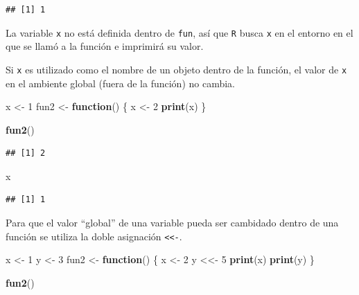 \documentclass[]{book}
\newenvironment{Shaded}{\begin{snugshade}}{\end{snugshade}}
\newcommand{\ControlFlowTok}[1]{\textcolor[rgb]{0.13,0.29,0.53}{\textbf{#1}}}
\newcommand{\DecValTok}[1]{\textcolor[rgb]{0.00,0.00,0.81}{#1}}
\newcommand{\KeywordTok}[1]{\textcolor[rgb]{0.13,0.29,0.53}{\textbf{#1}}}
\newcommand{\NormalTok}[1]{#1}
\newcommand{\StringTok}[1]{\textcolor[rgb]{0.31,0.60,0.02}{#1}}
\begin{document}
\begin{verbatim}
## [1] 1
\end{verbatim}

La variable \texttt{x} no está definida dentro de \texttt{fun}, así que \texttt{R} busca
\texttt{x} en el entorno en el que se llamó a la función e imprimirá su valor.

Si \texttt{x} es utilizado como el nombre de un objeto dentro de la
función, el valor de \texttt{x} en el ambiente global (fuera de la función) no
cambia.

\begin{Shaded}
\begin{Highlighting}[]
\NormalTok{x <-}\StringTok{ }\DecValTok{1}
\NormalTok{fun2 <-}\StringTok{ }\ControlFlowTok{function}\NormalTok{() \{}
\NormalTok{    x <-}\StringTok{ }\DecValTok{2}
    \KeywordTok{print}\NormalTok{(x)}
\NormalTok{\}}

\KeywordTok{fun2}\NormalTok{()}
\end{Highlighting}
\end{Shaded}

\begin{verbatim}
## [1] 2
\end{verbatim}

\begin{Shaded}
\begin{Highlighting}[]
\NormalTok{x}
\end{Highlighting}
\end{Shaded}

\begin{verbatim}
## [1] 1
\end{verbatim}

Para que el valor ``global'' de una variable pueda ser cambidado dentro de
una función se utiliza la doble asignación \texttt{\textless{}\textless{}-}.

\begin{Shaded}
\begin{Highlighting}[]
\NormalTok{x <-}\StringTok{ }\DecValTok{1}
\NormalTok{y <-}\StringTok{ }\DecValTok{3}
\NormalTok{fun2 <-}\StringTok{ }\ControlFlowTok{function}\NormalTok{() \{}
\NormalTok{    x <-}\StringTok{ }\DecValTok{2}
\NormalTok{    y <<-}\StringTok{ }\DecValTok{5}
    \KeywordTok{print}\NormalTok{(x)}
    \KeywordTok{print}\NormalTok{(y)}
\NormalTok{\}}

\KeywordTok{fun2}\NormalTok{()}
\end{Highlighting}
\end{Shaded}
\end{document}
